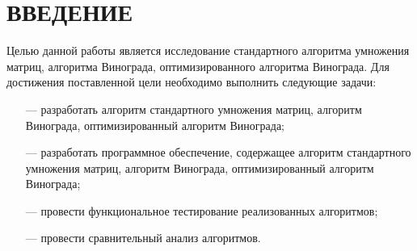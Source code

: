 \chapter*{\hfill{\centering \MakeUppercase{Введение}}\hfill} %

Целью данной работы является исследование стандартного алгоритма умножения матриц, алгоритма Винограда, оптимизированного алгоритма Винограда.
Для достижения поставленной цели необходимо выполнить следующие задачи:
\begin{itemize}
    \item[---] разработать алгоритм стандартного умножения матриц, алгоритм Винограда, оптимизированный алгоритм Винограда;
    \item[---] разработать программное обеспечение, содержащее алгоритм стандартного умножения матриц, алгоритм Винограда, оптимизированный алгоритм Винограда;
    \item[---] провести функциональное тестирование реализованных алгоритмов;
    \item[---] провести сравнительный анализ алгоритмов.
\end{itemize}

